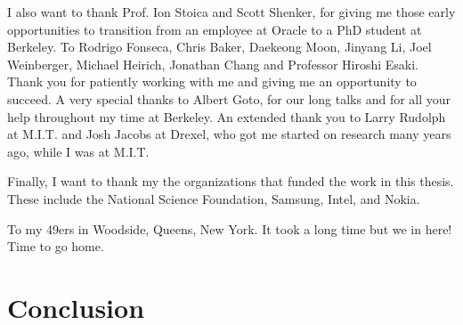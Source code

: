 \documentclass{ucbthesis}
\begin{document}
\begin{frontmatter}
\begin{acknowledgements}
I also want to thank Prof. Ion Stoica and Scott Shenker, for giving me those early opportunities to transition from an employee
at Oracle to a PhD student at Berkeley. To Rodrigo Fonseca, Chris Baker, Daekeong Moon, Jinyang Li, Joel Weinberger,
Michael Heirich, Jonathan Chang and
Professor Hiroshi Esaki.  Thank you for patiently working with me and giving me an opportunity to succeed.  
A very special thanks to Albert Goto, for our long talks and for all your help throughout my time at Berkeley.  
An extended
thank you to Larry Rudolph at M.I.T. and Josh Jacobs at Drexel, who got me started on research many years ago, while I was at M.I.T.

Finally, I want to thank my the organizations that funded the work in this thesis.  These include the National Science Foundation,
Samsung, Intel, and Nokia.

To my 49ers in Woodside, Queens, New York.  It took a long time but we in here!  Time to go home.








\end{acknowledgements}

\end{frontmatter}

\pagestyle{headings}










\chapter{Conclusion}
\label{chap:done}
\end{document}
